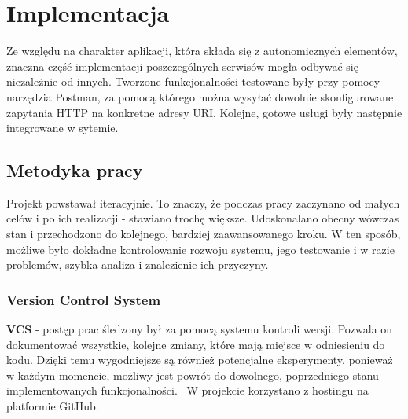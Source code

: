 \chapter{Implementacja}
\label{cha:implementacja}

Ze względu na charakter aplikacji, która składa się z autonomicznych elementów, znaczna część implementacji poszczególnych serwisów mogła odbywać się niezależnie od innych. Tworzone funkcjonalności testowane były przy pomocy narzędzia Postman, za pomocą którego można wysyłać dowolnie skonfigurowane zapytania HTTP na konkretne adresy URI. Kolejne, gotowe usługi były następnie integrowane w sytemie.


\section{Metodyka pracy}
Projekt powstawał iteracyjnie. To znaczy, że podczas pracy zaczynano od małych celów i po ich realizacji - stawiano trochę większe. Udoskonalano obecny wówczas stan i przechodzono do kolejnego, bardziej zaawansowanego kroku. W ten sposób, możliwe było dokładne kontrolowanie rozwoju systemu, jego testowanie i w razie problemów, szybka analiza i znalezienie ich przyczyny. 

\subsection{Version Control System}
\textbf{VCS} - postęp prac śledzony był za pomocą systemu kontroli wersji.
Pozwala on dokumentować wszystkie, kolejne zmiany, które mają miejsce w odniesieniu do kodu. Dzięki temu wygodniejsze są również potencjalne eksperymenty, ponieważ w każdym momencie, możliwy jest powrót do dowolnego, poprzedniego stanu implementowanych funkcjonalności.~\cite{vcs}
W projekcie korzystano z hostingu na platformie GitHub.

